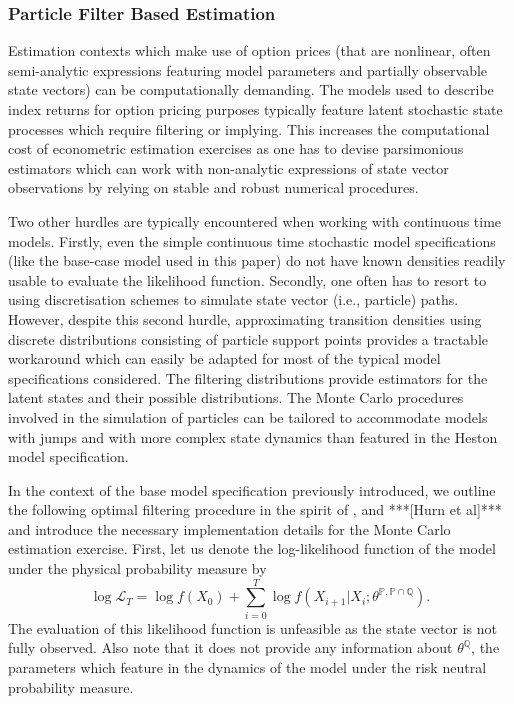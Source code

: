 \documentclass[11pt,a4paper,notitlepage]{article}
\numberwithin{equation}{section}
\begin{document}
 
\subsubsection{Particle Filter Based Estimation}
Estimation contexts which make use of option prices (that are nonlinear, often semi-analytic expressions featuring model parameters and partially observable state vectors) can be computationally demanding. The models used to describe index returns for option pricing purposes typically feature latent stochastic state processes which require filtering  or implying. This increases the computational cost of econometric estimation exercises as one has to devise parsimonious estimators which can work with non-analytic expressions of state vector observations by relying on stable and robust numerical procedures. 


Two other hurdles are typically encountered when working with continuous time models. Firstly, even the simple continuous time stochastic model specifications (like the base-case model used in this paper) do not have known densities readily usable to evaluate the likelihood function. Secondly, one often has to resort to using discretisation schemes to simulate state vector (i.e., particle) paths. However, despite this second hurdle, approximating transition densities using discrete distributions consisting of particle support points provides a tractable workaround which can easily be adapted for most of the typical model specifications considered. The filtering distributions provide estimators for the latent states and their possible distributions. The Monte Carlo procedures involved in the simulation of particles can be tailored to accommodate models with jumps and with more complex state dynamics than featured in the Heston model specification. 

In the context of the base model specification previously introduced, we outline the following optimal filtering procedure in the spirit of \citet{johannes2009optimal}, \citet{christoffersen2010volatility} and ***[Hurn et al]*** and introduce the necessary implementation details for the Monte Carlo estimation exercise. First, let us denote the  log-likelihood function of the model under the physical probability measure by
\begin{equation}
\log \mathcal{L}_T = \log f(X_0) + \sum_{i=0}^T \log f(X_{i+1}|X_{i};\theta^{\mathbb{P},\mathbb{P}\cap\mathbb{Q}}).
\end{equation}
The evaluation of this likelihood function is unfeasible as the state vector is not fully observed. Also note that it does not provide any information about $\theta^\mathbb{Q}$, the parameters which feature in the dynamics of the model under the risk neutral probability measure.
 
\end{document}
